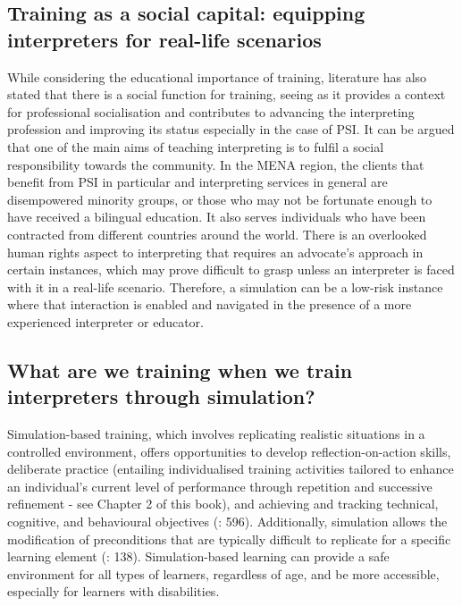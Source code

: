 \documentclass[output=paper]{langscibook}
\begin{document}
\subsection{Training as a social capital: equipping interpreters for real-life scenarios}

While considering the educational importance of training, literature has also stated that there is a social function for training, seeing as it provides a context for professional socialisation and contributes to advancing the interpreting profession and improving its status \citep[167]{hale2007community} especially in the case of PSI. It can be argued that one of the main aims of teaching interpreting is to fulfil a social responsibility towards the community. In the MENA region, the clients that benefit from PSI in particular and interpreting services in general are disempowered minority groups, or those who may not be fortunate enough to have received a bilingual education. It also serves individuals who have been contracted from different countries around the world. There is an overlooked human rights aspect to interpreting that requires an advocate’s approach in certain instances, which may prove difficult to grasp unless an interpreter is faced with it in a real-life scenario. Therefore, a simulation can be a low-risk instance where that interaction is enabled and navigated in the presence of a more experienced interpreter or educator. 

\subsection{What are we training when we train interpreters through simulation?}

Simulation-based training, which involves replicating realistic situations in a controlled environment, offers opportunities to develop reflection-on-action skills, deliberate practice (entailing individualised training activities tailored to enhance an individual’s current level of performance through repetition and successive refinement - see Chapter 2 of this book), and achieving and tracking technical, cognitive, and behavioural objectives (\citealt{anderson2008instructional}: 596). Additionally, simulation allows the modification of preconditions that are typically difficult to replicate for a specific learning element (\citealt{nyström2024simulators}: 138). Simulation-based learning can provide a safe environment for all types of learners, regardless of age, and be more accessible, especially for learners with disabilities.
\end{document}
